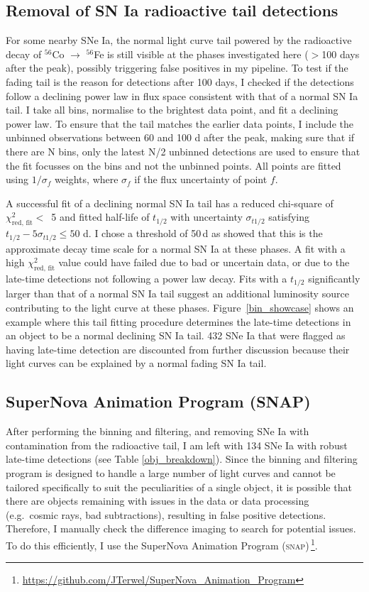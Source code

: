 \documentclass[a4paper,oneside,12pt, class=Latex/Classes/PhDthesisPSnPDF, crop=false]{standalone}
\begin{document}
\subsection{Removal of SN Ia radioactive tail detections}
\label{tail_removal}
For some nearby SNe Ia, the normal light curve tail powered by the radioactive decay of $^{56}$Co $\rightarrow$ $^{56}$Fe is still visible at the phases investigated here ($>$100 days after the peak), possibly triggering false positives in my pipeline. To test if the fading tail is the reason for detections after 100 days, I checked if the detections follow a declining power law in flux space consistent with that of a normal SN Ia tail. I take all bins, normalise to the brightest data point, and fit a declining power law. To ensure that the tail matches the earlier data points, I include the unbinned observations between 60 and 100 d after the peak, making sure that if there are N bins, only the latest N/2 unbinned detections are used to ensure that the fit focusses on the bins and not the unbinned points. All points are fitted using $1/\sigma_f$ weights, where $\sigma_f$ if the flux uncertainty of point $f$.

A successful fit of a declining normal SN Ia tail has a reduced chi-square of $\chi^2_\text{red, fit} <$~5 and fitted half-life of $t_{1/2}$ with uncertainty $\sigma_{t1/2}$ satisfying $t_{1/2} - 5\sigma_{t1/2} \leq 50$ d. I chose a threshold of 50\,d as \citet{Georgios_11fe} showed that this is the approximate decay time scale for a normal SN Ia at these phases. A fit with a high $\chi^2_\text{red, fit}$ value could have failed due to bad or uncertain data, or due to the late-time detections not following a power law decay. Fits with a $t_{1/2}$ significantly larger than that of a normal SN Ia tail suggest an additional luminosity source contributing to the light curve at these phases. Figure~\ref{bin_showcase} shows an example where this tail fitting procedure determines the late-time detections in an object to be a normal declining SN Ia tail. 432 SNe Ia that were flagged as having late-time detection are discounted from further discussion because their light curves can be explained by a normal fading SN Ia tail.


\subsection{SuperNova Animation Program (SNAP)}
\label{snap}
After performing the binning and filtering, and removing SNe Ia with contamination from the radioactive tail, I am left with 134 SNe Ia with robust late-time detections (see Table \ref{obj_breakdown}). Since the binning and filtering program is designed to handle a large number of light curves and cannot be tailored specifically to suit the peculiarities of a single object, it is possible that there are objects remaining with issues in the data or data processing (e.g.~cosmic rays, bad subtractions), resulting in false positive detections. Therefore, I manually check the difference imaging to search for potential issues. To do this efficiently, I use the SuperNova Animation Program (\textsc{snap})\,\footnote{\url{https://github.com/JTerwel/SuperNova_Animation_Program}}.
\end{document}

